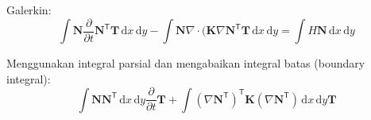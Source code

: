 Galerkin:
\begin{equation*}
\int \mathbf{N} \frac{\partial}{\partial t} \mathbf{N}^{\mathsf{T}}
\mathbf{T} \, \mathrm{d}x \, \mathrm{d}y - 
\int \mathbf{N} \nabla \cdot
(\mathbf{K} \nabla \mathbf{N}^{\mathsf{T}} \mathbf{T}
\, \mathrm{d}x \, \mathrm{d}y = 
\int H \mathbf{N} \, \mathrm{d}x \, \mathrm{d}y
\end{equation*}

Menggunakan integral parsial dan mengabaikan integral batas (boundary integral):
\begin{equation*}
\int \mathbf{N} \mathbf{N}^{\mathsf{T}} \, \mathrm{d}x \, \mathrm{d}y
\frac{\partial}{\partial t} \mathbf{T} +
\int ( \nabla \mathbf{N}^{\mathsf{T}} )^{\mathsf{T}} \mathbf{K}
( \nabla \mathbf{N}^{\mathsf{T}}) \, \mathrm{d}x \, \mathrm{d}y \mathbf{T}
\end{equation*}


